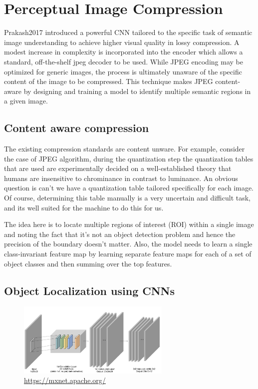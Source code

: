 \chapter{Perceptual Image Compression}

Prakash2017 \cite{Prakash2017} introduced a powerful CNN
tailored to the specific task of semantic image understanding to achieve higher visual quality in lossy compression. A modest increase in complexity is incorporated into the encoder which allows a standard, off-the-shelf jpeg decoder to be used. While JPEG encoding may be optimized for generic images, the process is ultimately unaware of the specific content of the image to be compressed. This technique makes JPEG content-aware by designing and training a model to identify multiple semantic regions in a given image.


\section{Content aware compression}

The existing compression standards are content unware. For example, consider the case of JPEG algorithm, during the quantization step the quantization tables that are used are experimentally decided on a well-established theory that humans are insensitive to chrominance in contrast to luminance. An obvious question is can't we have a quantization table tailored specifically for each image. Of course, determining this table manually is a very uncertain and difficult task, and its well suited for the machine to do this for us.

The idea here is to locate multiple regions of interest (ROI) within a single image and noting the fact that it's not an object detection problem and hence the precision of the boundary doesn't matter. Also, the model needs to learn a single class-invariant feature map by learning separate feature maps for each of a set of object classes and then summing over the top features.

\section{Object Localization using CNNs}

\begin{figure}[!ht]
    \centering
    \includegraphics[width=0.65\textwidth]{fig/4-1.png}
    {\href{https://mxnet.apache.org/api/python/docs/tutorials/packages/gluon/image/mnist.html}{https://mxnet.apache.org/}}
    \label{fig:firstConvLayerLeNet}
\end{figure}

